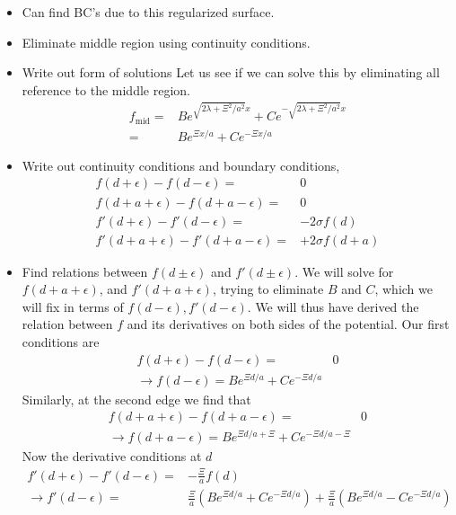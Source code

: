 \begin{itemize}
  \item {Can find BC's due to this regularized surface.}
  \item Eliminate middle region using continuity conditions.  
  \item Write out form of solutions
    Let us see if we can solve this by eliminating all reference to the middle region.  
    \begin{align}
      f_{\text{mid}} =& Be^{\sqrt{2\lambda + \Xi^2/a^2}x} + C e^{-\sqrt{2\lambda + \Xi^2/a^2}x}\\
      =& Be^{\Xi x/a} + C e^{-\Xi x/a}
    \end{align}
  \item Write out continuity conditions
    and boundary conditions, 
    \begin{subequations}
      \begin{align}
        f(d + \epsilon)-f(d -\epsilon) =& 0\\
        f(d+a+\epsilon)- f(d+a-\epsilon)=& 0\\
        f'(d + \epsilon) -f'(d -\epsilon)=& -2\sigma f(d)\\
        f'(d+a+\epsilon) -f'(d+a-\epsilon)=& +2\sigma f(d+a)
      \end{align}
    \end{subequations}
  \item Find relations between $f(d\pm \epsilon)$ and $f'(d\pm \epsilon)$.
    We will solve for $f(d+a+\epsilon)$, and $f'(d+a+\epsilon)$, trying to eliminate $B$ and $C$, which we will fix in terms of $f(d-\epsilon),f'(d-\epsilon)$.  We will thus have derived the relation between $f$ and its derivatives on both sides of the potential.      
    Our first conditions are
    \begin{align}
      f(d+\epsilon) - f(d-\epsilon) =& 0\\
      \rightarrow f(d-\epsilon) = Be^{\Xi d/a} + C e^{-\Xi d/a}\label{eq:M c1}
    \end{align}
    Similarly, at the second edge  we find that 
    \begin{align}
      f(d+a+\epsilon) - f(d+a-\epsilon) =& 0\\
      \rightarrow f(d+a-\epsilon) = Be^{\Xi d/a+\Xi} + C e^{-\Xi d/a-\Xi}\label{eq:M c2}
    \end{align}
    Now the derivative conditions at $d$
    \begin{align}
      f'(d +\epsilon)-f'(d-\epsilon) =& -\frac{\Xi}{a}f(d)\\
      \rightarrow f'(d-\epsilon)=& \frac{\Xi}{a}\left(Be^{\Xi d/a} + C e^{-\Xi d/a}\right) + \frac{\Xi}{a}\left(Be^{\Xi d/a} - C e^{-\Xi d/a}\right)\\

\end{align}
\end{itemize}
